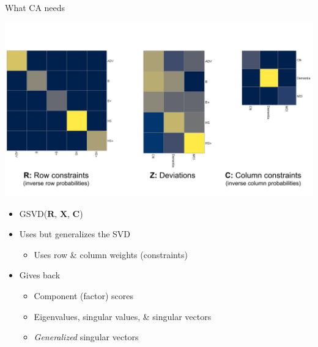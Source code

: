 \documentclass[
  ignorenonframetext,
]{beamer}
\providecommand{\tightlist}{%
  \setlength{\itemsep}{0pt}\setlength{\parskip}{0pt}}
\begin{document}
\begin{frame}{What CA needs}
\protect\hypertarget{what-ca-needs}{}

\includegraphics{../images/CA_matrices.png}

\end{frame}

\begin{frame}

\begin{itemize}[<+->]
\tightlist
\item
  GSVD(\(\mathbf{R}\), \(\mathbf{X}\), \(\mathbf{C}\))
\item
  Uses but generalizes the SVD

  \begin{itemize}[<+->]
  \tightlist
  \item
    Uses row \& column weights (constraints)
  \end{itemize}
\item
  Gives back

  \begin{itemize}[<+->]
  \tightlist
  \item
    Component (factor) scores
  \item
    Eigenvalues, singular values, \& singular vectors
  \item
    \emph{Generalized} singular vectors
  \end{itemize}
\end{itemize}

\end{frame}
\end{document}
